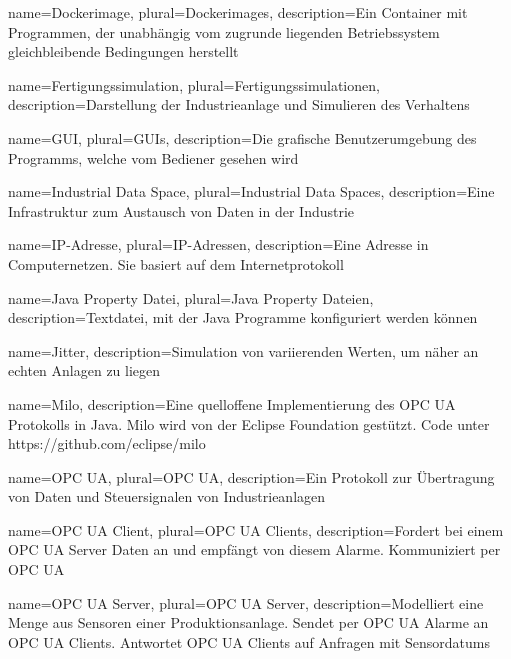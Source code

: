 
{
  name=Dockerimage,
  plural=Dockerimages,
  description={Ein Container mit Programmen, der unabhängig vom zugrunde liegenden Betriebssystem gleichbleibende Bedingungen herstellt}
}

{
  name=Fertigungssimulation,
  plural=Fertigungssimulationen,
  description={Darstellung der Industrieanlage und Simulieren des Verhaltens}
}

{
  name=GUI,
  plural=GUIs,
  description={Die grafische Benutzerumgebung des Programms, welche vom Bediener gesehen wird}
}

{
  name=Industrial Data Space,
  plural=Industrial Data Spaces,
  description={Eine Infrastruktur zum Austausch von Daten in der Industrie}
}

{
  name=IP-Adresse,
  plural=IP-Adressen,
  description={Eine Adresse in Computernetzen. Sie basiert auf dem Internetprotokoll}
}

{
  name=Java Property Datei,
  plural=Java Property Dateien,
  description={Textdatei, mit der Java Programme konfiguriert werden können}
}

{
  name=Jitter,
  description={Simulation von variierenden Werten, um näher an echten Anlagen zu liegen}
}

{
  name=Milo,
  description={Eine quelloffene Implementierung des \gls{OPC UA} Protokolls in Java. Milo wird von der Eclipse Foundation gest\"utzt. Code unter https://github.com/eclipse/milo}
}

{
  name=OPC UA,
  plural=OPC UA,
  description={Ein Protokoll zur Übertragung von Daten und Steuersignalen von Industrieanlagen}
}

{
  name=OPC UA Client,
  plural=OPC UA Clients,
  description={Fordert bei einem \gls{OPC UA Server} Daten an und empf\"angt von diesem Alarme. Kommuniziert per \gls{OPC UA}}
}

{
  name=OPC UA Server,
  plural=OPC UA Server,
  description={Modelliert eine Menge aus Sensoren einer \gls{Produktionsanlage}. Sendet per \gls{OPC UA} Alarme an \glspl{OPC UA Client}. Antwortet \glspl{OPC UA Client} auf Anfragen mit \glspl{Sensordatum}}
}

